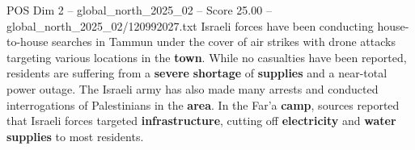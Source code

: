 \begin{textsample}{POS Dim 2 – global\_north\_2025\_02 – Score 25.00 – global\_north\_2025\_02/120992027.txt}
Israeli forces have been conducting house-to-house searches in Tammun under the cover of air strikes with drone attacks targeting various locations in the \textbf{town}.
While no casualties have been reported, residents are suffering from a \textbf{severe} \textbf{shortage} of \textbf{supplies} and a near-total power outage.
The Israeli army has also made many arrests and conducted interrogations of Palestinians in the \textbf{area}.
In the Far'a \textbf{camp}, sources reported that Israeli forces targeted \textbf{infrastructure}, cutting off \textbf{electricity} and \textbf{water} \textbf{supplies} to most residents.

\end{textsample}
